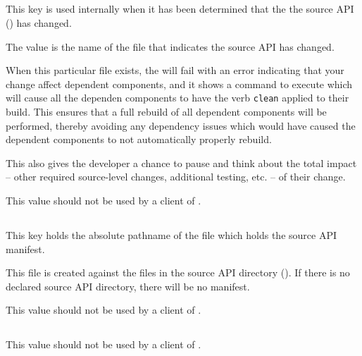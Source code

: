 \subsection{}\label{lmsbwcomponent:souce-api}

\subsection{}

This key is used internally when it has been determined that the the
source API () has changed.

The value is the name of the file that indicates the source API has
changed.

When this particular file exists, the \lmsbw will fail with an error
indicating that your change affect dependent components, and it shows
a command to execute which will cause all the dependen components to
have the verb \texttt{clean} applied to their build.  This ensures
that a full rebuild of all dependent components will be performed,
thereby avoiding any dependency issues which would have caused the
dependent components to not automatically properly rebuild.

This also gives the developer a chance to pause and think about the
total impact -- other required source-level changes, additional
testing, etc. -- of their change.

This value should not be used by a client of \lmsbw.

\subsection{}

This key holds the absolute pathname of the file which holds the
source API \mtree manifest.

This file is created against the files in the source API directory
().  If there is no declared source API
directory, there will be no manifest.

This value should not be used by a client of \lmsbw.

\subsection{}
\subsection{}

This value should not be used by a client of \lmsbw.


